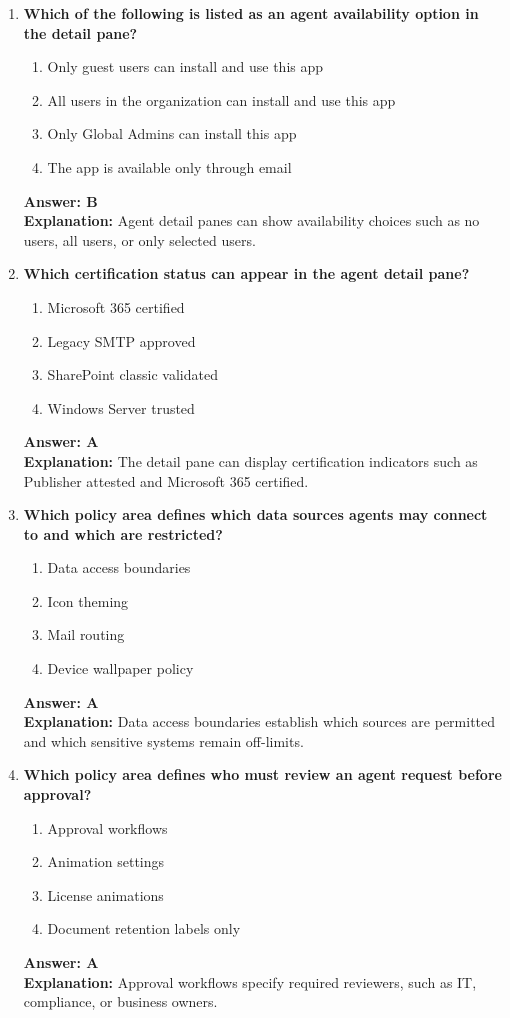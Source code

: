 \documentclass[10pt]{article}
\begin{document}
\begin{enumerate}[leftmargin=*]
\item \textbf{Which of the following is listed as an agent availability option in the detail pane?}
\begin{enumerate}[label=\Alph*.]
  \item Only guest users can install and use this app
  \item All users in the organization can install and use this app
  \item Only Global Admins can install this app
  \item The app is available only through email
\end{enumerate}
\textbf{Answer: B}\\
\textbf{Explanation:} Agent detail panes can show availability choices such as no users, all users, or only selected users.

\item \textbf{Which certification status can appear in the agent detail pane?}
\begin{enumerate}[label=\Alph*.]
  \item Microsoft 365 certified
  \item Legacy SMTP approved
  \item SharePoint classic validated
  \item Windows Server trusted
\end{enumerate}
\textbf{Answer: A}\\
\textbf{Explanation:} The detail pane can display certification indicators such as Publisher attested and Microsoft 365 certified.

\item \textbf{Which policy area defines which data sources agents may connect to and which are restricted?}
\begin{enumerate}[label=\Alph*.]
  \item Data access boundaries
  \item Icon theming
  \item Mail routing
  \item Device wallpaper policy
\end{enumerate}
\textbf{Answer: A}\\
\textbf{Explanation:} Data access boundaries establish which sources are permitted and which sensitive systems remain off-limits.

\item \textbf{Which policy area defines who must review an agent request before approval?}
\begin{enumerate}[label=\Alph*.]
  \item Approval workflows
  \item Animation settings
  \item License animations
  \item Document retention labels only
\end{enumerate}
\textbf{Answer: A}\\
\textbf{Explanation:} Approval workflows specify required reviewers, such as IT, compliance, or business owners.


\end{enumerate}
\end{document}
